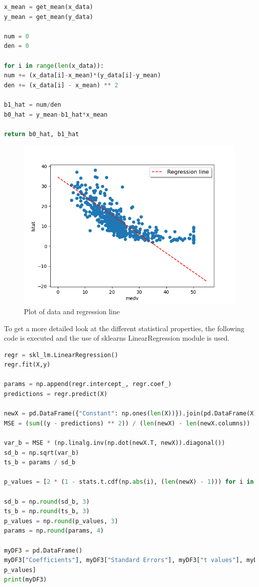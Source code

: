 \begin{lstlisting}[language=Python]
x_mean = get_mean(x_data)
y_mean = get_mean(y_data)

num = 0
den = 0

for i in range(len(x_data)):
num += (x_data[i]-x_mean)*(y_data[i]-y_mean)
den += (x_data[i] - x_mean) ** 2

b1_hat = num/den
b0_hat = y_mean-b1_hat*x_mean

return b0_hat, b1_hat
\end{lstlisting}

\begin{figure}[H]
	\centering
	\includegraphics[width=\textwidth]{Img/lab1_plot.PNG}
	\caption{Plot of data and regression line}
	\label{fig:lab1_plot}
\end{figure} 

To get a more detailed look at the different statistical properties, the following code is executed and the use of sklearns LinearRegression module is used.

\begin{lstlisting}[language=Python]
regr = skl_lm.LinearRegression()
regr.fit(X,y)

params = np.append(regr.intercept_, regr.coef_)
predictions = regr.predict(X)

newX = pd.DataFrame({"Constant": np.ones(len(X))}).join(pd.DataFrame(X))
MSE = (sum((y - predictions) ** 2)) / (len(newX) - len(newX.columns))

var_b = MSE * (np.linalg.inv(np.dot(newX.T, newX)).diagonal())
sd_b = np.sqrt(var_b)
ts_b = params / sd_b

p_values = [2 * (1 - stats.t.cdf(np.abs(i), (len(newX) - 1))) for i in ts_b]

sd_b = np.round(sd_b, 3)
ts_b = np.round(ts_b, 3)
p_values = np.round(p_values, 3)
params = np.round(params, 4)

myDF3 = pd.DataFrame()
myDF3["Coefficients"], myDF3["Standard Errors"], myDF3["t values"], myDF3["Probabilities"] = [params, sd_b, ts_b,
p_values]
print(myDF3)
\end{lstlisting}

